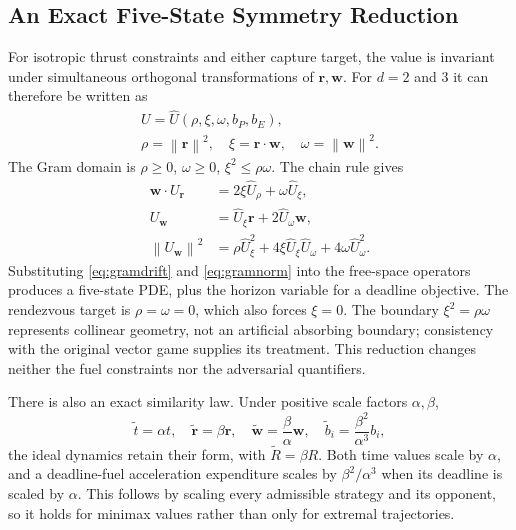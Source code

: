 \documentclass[journal,a4paper]{IEEEtran}
\newcommand{\norm}[1]{\left\|#1\right\|}
\begin{document}
\subsection{An Exact Five-State Symmetry Reduction}
For isotropic thrust constraints and either capture target, the value is invariant under simultaneous orthogonal transformations of $\mathbf r,\mathbf w$. For $d=2$ and $3$ it can therefore be written as
\begin{equation}
\begin{gathered}
 U=\widehat U(\rho,\xi,\omega,b_P,b_E),\\
 \rho=\norm{\mathbf r}^2,\quad
 \xi=\mathbf r\cdot\mathbf w,\quad
 \omega=\norm{\mathbf w}^2.
\end{gathered}
 \label{eq:invariants}
\end{equation}
The Gram domain is $\rho\ge0$, $\omega\ge0$, $\xi^2\le\rho\omega$. The chain rule gives
\begin{align}
 \mathbf w\cdot U_{\mathbf r}
     &=2\xi\widehat U_\rho+\omega\widehat U_\xi,\label{eq:gramdrift}\\
 U_{\mathbf w}&=\widehat U_\xi\mathbf r+2\widehat U_\omega\mathbf w,\\
 \norm{U_{\mathbf w}}^2
     &=\rho\widehat U_\xi^2+4\xi\widehat U_\xi\widehat U_\omega
                                +4\omega\widehat U_\omega^2.
 \label{eq:gramnorm}
\end{align}
Substituting \eqref{eq:gramdrift} and \eqref{eq:gramnorm} into the free-space operators produces a five-state PDE, plus the horizon variable for a deadline objective. The rendezvous target is $\rho=\omega=0$, which also forces $\xi=0$. The boundary $\xi^2=\rho\omega$ represents collinear geometry, not an artificial absorbing boundary; consistency with the original vector game supplies its treatment. This reduction changes neither the fuel constraints nor the adversarial quantifiers.

There is also an exact similarity law. Under positive scale factors $\alpha,\beta$,
\begin{equation}
 \widetilde t=\alpha t,\quad \widetilde{\mathbf r}=\beta\mathbf r,\quad
 \widetilde{\mathbf w}=\frac\beta\alpha\mathbf w,\quad
 \widetilde b_i=\frac{\beta^2}{\alpha^3}b_i,
 \label{eq:freescaling}
\end{equation}
the ideal dynamics retain their form, with $\widetilde R=\beta R$. Both time values scale by $\alpha$, and a deadline-fuel acceleration expenditure scales by $\beta^2/\alpha^3$ when its deadline is scaled by $\alpha$. This follows by scaling every admissible strategy and its opponent, so it holds for minimax values rather than only for extremal trajectories.
\end{document}
